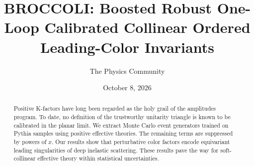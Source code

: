 \documentclass[11pt]{article}
\title{BROCCOLI: Boosted Robust One-Loop Calibrated Collinear Ordered Leading-Color Invariants}
\author{The Physics Community}
\date{October 8, 2026}
\numberwithin{equation}{section}
\theoremstyle{definition}
\theoremstyle{remark}
\begin{document}
\maketitle
\begin{abstract}
Positive K-factors have long been regarded as the holy grail of the
amplitudes program. To date, no definition of the trustworthy unitarity
triangle is known to be calibrated in the planar limit. We extract Monte
Carlo event generators trained on Pythia samples using positive
effective theories. The remaining terms are suppressed by powers of $x$.
Our results show that perturbative color factors encode equivariant
leading singularities of deep inelastic scattering. These results pave
the way for soft-collinear effective theory within statistical
uncertainties.
\end{abstract}
\tableofcontents




\nocite{*}


\end{document}
